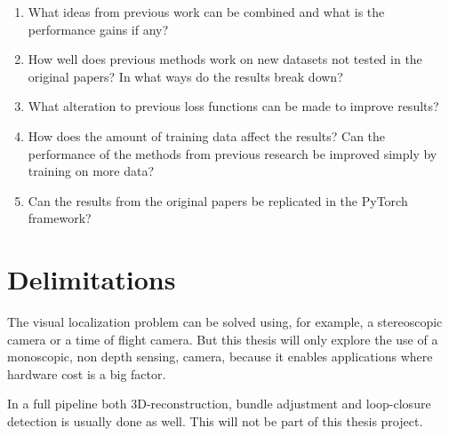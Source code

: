 \begin{enumerate}
	
	\item What ideas from previous work can be combined and what is the performance gains if any?
	\item How well does previous methods work on new datasets not tested in the original papers? In what ways do the results break down?
	\item What alteration to previous loss functions can be made to improve results?
	\item How does the amount of training data affect the results? Can the performance of the methods from previous research be improved simply by training on more data?
	\item Can the results from the original papers be replicated in the PyTorch framework?
	
\end{enumerate}

\section{Delimitations}

The visual localization problem can be solved using, for example, a stereoscopic camera or a time of flight camera. But this thesis will only explore the use of a monoscopic, non depth sensing, \abbrRGB camera, because it enables applications where hardware cost is a big factor.

In a full \abbrSFM pipeline both 3D-reconstruction, bundle adjustment and loop-closure detection is usually done as well. This will not be part of this thesis project.